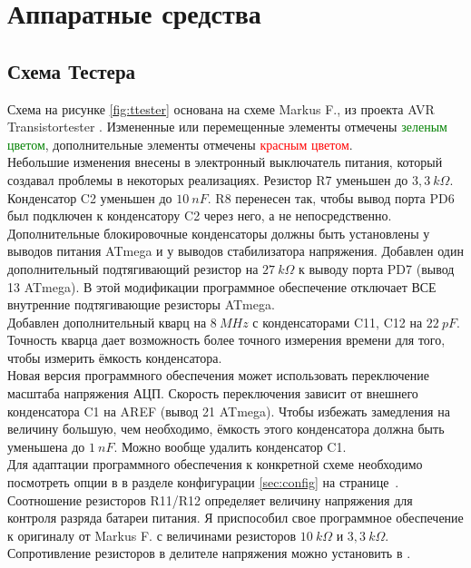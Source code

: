\chapter{Аппаратные средства}

\section{Схема Тестера}
\label{sec:hardware}

Схема на рисунке \ref{fig:ttester} основана на схеме Markus F., из проекта AVR Transistortester \cite{Frejek}.
Измененные или перемещенные элементы отмечены \textcolor{green}{зеленым цветом}, дополнительные элементы 
отмечены \textcolor{red}{красным цветом}.\\

Небольшие изменения внесены в электронный выключатель питания, который создавал проблемы в некоторых реализациях. 
Резистор R7 уменьшен до  \(3,3~k\Omega\). Конденсатор C2 уменьшен до \(10~nF\). R8 перенесен так, чтобы вывод порта 
PD6 был подключен к конденсатору C2 через него, а не непосредственно.\\

Дополнительные блокировочные конденсаторы должны быть установлены у выводов питания ATmega и у выводов стабилизатора 
напряжения. 
Добавлен один дополнительный подтягивающий резистор на \(27~k\Omega\) к выводу порта PD7 (вывод 13 ATmega). В этой 
модификации программное обеспечение отключает ВСЕ внутренние подтягивающие резисторы ATmega.\\
 
Добавлен дополнительный кварц на \(8~MHz\) с конденсаторами C11, C12 на \(22~pF\). Точность кварца дает возможность 
более точного измерения времени для того, чтобы измерить ёмкость конденсатора.\\

Новая версия программного обеспечения может использовать переключение масштаба напряжения АЦП. Скорость переключения 
зависит от внешнего конденсатора C1 на AREF (вывод 21 ATmega). Чтобы избежать замедления на величину большую, чем 
необходимо, ёмкость этого конденсатора должна быть уменьшена до \(1~nF\). Можно вообще удалить конденсатор C1.\\
Для адаптации программного обеспечения к конкретной схеме необходимо посмотреть опции в  в 
разделе конфигурации \ref{sec:config} на странице~\pageref{sec:config}. \\

Соотношение резисторов R11/R12 определяет величину напряжения для контроля разряда батареи питания. Я приспособил свое 
программное обеспечение к оригиналу от  Markus F. \cite{Frejek} с величинами резисторов \(10~k\Omega\) и \(3,3~k\Omega\).
Сопротивление резисторов в делителе напряжения можно установить в .\\

